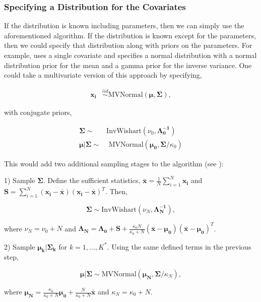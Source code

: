 \documentclass[
  12pt,
]{article}
\begin{document}
\subsubsection{Specifying a Distribution for the Covariates}
\label{sec:normaldistributioncovariate}

If the distribution is known including parameters, then we can simply
use the aforementioned algorithm. If the distribution is known except
for the parameters, then we could specify that distribution along with
priors on the parameters. For example, \cite{royle_analysis_2009} uses a
single covariate and specifies a normal distribution with a normal
distribution prior for the mean and a gamma prior for the inverse
variance. One could take a multivariate version of this approach by
specifying,

\begin{align} 
\label{eqn:normalcovariatedistribution}
\boldsymbol{x_{i}} & \stackrel{iid}{\sim} \text{MVNormal}(\boldsymbol{\mu},\boldsymbol{\Sigma}),
\end{align}

with conjugate priors,

\begin{align}
\boldsymbol{\Sigma} \sim & \text{InvWishart}(\nu_{0},\boldsymbol{\Lambda_{0}^{-1}}) \\
\boldsymbol{\mu}|\boldsymbol{\Sigma} \sim & \text{ MVNormal}(\boldsymbol{\mu_{0}},\boldsymbol{\Sigma}/\kappa_{0})
\end{align}

This would add two additional sampling stages to the algorithm (see
\cite{gelman_bayesian_2014}):

\begin{list}{}{}
\item[1)] Sample $\boldsymbol{\Sigma}$.  Define the sufficient statistics, $\boldsymbol{\bar{x}}=\frac{1}{N}\sum_{i=1}^{N}\boldsymbol{x_{i}}$ and $\boldsymbol{S} = \sum_{i=1}^{N}(\boldsymbol{x_{i}}-\boldsymbol{\bar{x}})(\boldsymbol{x_{i}}-\boldsymbol{\bar{x}})^T$.  Then,

\begin{equation}
\boldsymbol{\Sigma} \sim \text{InvWishart}(\nu_{N},\boldsymbol{\Lambda_{N}^{-1}}),
\end{equation}

where $\nu_{N} = \nu_{0}+N$ and $\boldsymbol{\Lambda_{N}}=\boldsymbol{\Lambda_{0}}+\boldsymbol{S}+\frac{\kappa_{0}N}{\kappa_{0}+N}(\boldsymbol{\bar{x}}-\boldsymbol{\mu_{0}})(\boldsymbol{\bar{x}}-\boldsymbol{\mu_{0}})^T$.

\item[2)] Sample $\boldsymbol{\mu_k|\Sigma_k}$ for $k=1,...,K^*$.  Using the same defined terms in the previous step,

\begin{equation}
\boldsymbol{\mu}|\boldsymbol{\Sigma} \sim \text{MVNormal}(\boldsymbol{\mu_{N}},\boldsymbol{\Sigma}/\kappa_{N} ),
\end{equation}

where $\boldsymbol{\mu_{N}}=\frac{\kappa_{0}}{\kappa_{0}+N}\boldsymbol{\mu_{0}} + \frac{N}{\kappa_{0}+N}\boldsymbol{\bar{x}} $ and $\kappa_{N}=\kappa_{0}+N$.
\end{list}
\end{document}
